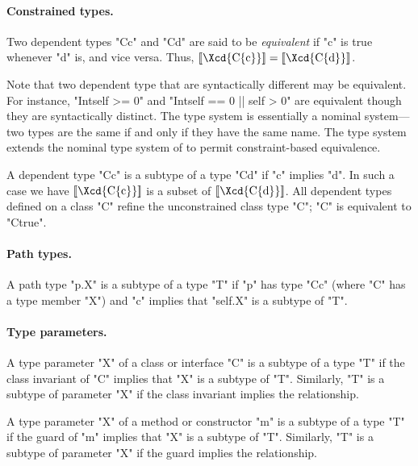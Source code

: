 \paragraph{Constrained types.}

Two dependent types \xcd"C{c}" and \xcd"C{d}" are said to be {\em equivalent} if 
\xcd"c" is true whenever \xcd"d" is, and vice versa. Thus, 
$\LL{\mbox{\Xcd{C\{c\}}}} = \LL{\mbox{\Xcd{C\{d\}}}}$.

Note that two dependent type that are syntactically different may be
equivalent. For instance, \xcd"Int{self >= 0}" and
\xcd"Int{self == 0 || self > 0}" are equivalent though they are syntactically
distinct. The \Java{} type system is essentially a nominal system---two
types are the same if and only if they have the same name. The \Xten{}
type system extends the nominal type system of \Java{} to permit
constraint-based equivalence.

A dependent type \xcd"C{c}" is a subtype of a type \xcd"C{d}" if
\xcd"c" implies \xcd"d".  In such a case we have
$\LL{\mbox{\Xcd{C\{c\}}}}$ is a
subset of $\LL{\mbox{\Xcd{C\{d\}}}}$. All dependent types
defined on a class \xcd"C"
refine the unconstrained class type \xcd"C"; \xcd"C" is
equivalent to \xcd"C{true}".

\paragraph{Path types.}

A path type \xcd"p.X" is a subtype of a type \xcd"T" if
\xcd"p" has type \xcd"C{c}" (where \xcd"C" has a type member
\xcd"X") and \xcd"c" implies that \xcd"self.X" is a subtype of \xcd"T".

\paragraph{Type parameters.}

A type parameter \xcd"X" of a class or interface \xcd"C"
is a subtype of a type \xcd"T" if
the 
class invariant of \xcd"C" implies that \xcd"X" is a subtype of \xcd"T".
Similarly, \xcd"T" is a subtype of parameter \xcd"X" if the
class invariant implies the relationship.

A type parameter \xcd"X" of a method
\iftypeparams\else
or constructor
\fi
\xcd"m"
is a subtype of a type \xcd"T" if
the 
guard of \xcd"m" implies that \xcd"X" is a subtype of \xcd"T".
Similarly, \xcd"T" is a subtype of parameter \xcd"X" if the
guard implies the relationship.


